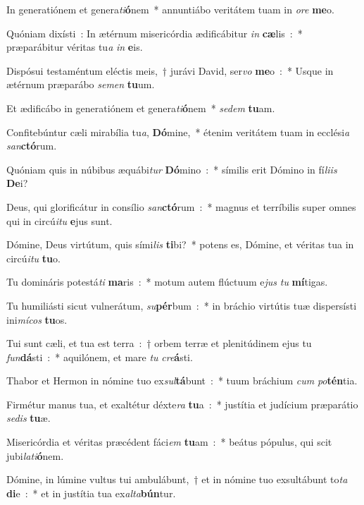 \item In generatiónem et genera\emph{ti}\textbf{ó}nem~* annuntiábo veritátem tuam in \emph{o}\emph{re} \textbf{me}o.
\item Quóniam dixísti~: In ætérnum misericórdia ædificábitur \emph{in} \textbf{cæ}lis~:~* præparábitur véritas tu\emph{a} \emph{in} \textbf{e}is.
\item Dispósui testaméntum eléctis meis,~† jurávi David, ser\emph{vo} \textbf{me}o~:~* Usque in ætérnum præparábo \emph{se}\emph{men} \textbf{tu}um.
\item Et ædificábo in generatiónem et genera\emph{ti}\textbf{ó}nem~* \emph{se}\emph{dem} \textbf{tu}am.
\item Confitebúntur cæli mirabília tu\emph{a}, \textbf{Dó}mine,~* étenim veritátem tuam in ecclési\emph{a} \emph{san}\textbf{ctó}rum.
\item Quóniam quis in núbibus æquábi\emph{tur} \textbf{Dó}mino~:~* símilis erit Dómino in fí\emph{li}\emph{is} \textbf{De}i?
\item Deus, qui glorificátur in consílio \emph{san}\textbf{ctó}rum~:~* magnus et terríbilis super omnes qui in circú\emph{i}\emph{tu} \textbf{e}jus sunt.
\item Dómine, Deus virtútum, quis sími\emph{lis} \textbf{ti}bi?~* potens es, Dómine, et véritas tua in circú\emph{i}\emph{tu} \textbf{tu}o.
\item Tu domináris potestá\emph{ti} \textbf{ma}ris~:~* motum autem flúctuum e\emph{jus} \emph{tu} \textbf{mí}tigas.
\item Tu humiliásti sicut vulnerátum, \emph{su}\textbf{pér}bum~:~* in bráchio virtútis tuæ dispersísti ini\emph{mí}\emph{cos} \textbf{tu}os.
\item Tui sunt cæli, et tua est terra~:~† orbem terræ et plenitúdinem ejus tu \emph{fun}\textbf{dá}sti~:~* aquilónem, et mare \emph{tu} \emph{cre}\textbf{á}sti.
\item Thabor et Hermon in nómine tuo ex\emph{sul}\textbf{tá}bunt~:~* tuum bráchium \emph{cum} \emph{po}\textbf{tén}tia.
\item Firmétur manus tua, et exaltétur déxte\emph{ra} \textbf{tu}a~:~* justítia et judícium præparátio \emph{se}\emph{dis} \textbf{tu}æ.
\item Misericórdia et véritas præcédent fáci\emph{em} \textbf{tu}am~:~* beátus pópulus, qui scit jubi\emph{la}\emph{ti}\textbf{ó}nem.
\item Dómine, in lúmine vultus tui ambulábunt,~† et in nómine tuo exsultábunt to\emph{ta} \textbf{di}e~:~* et in justítia tua ex\emph{al}\emph{ta}\textbf{bún}tur.

